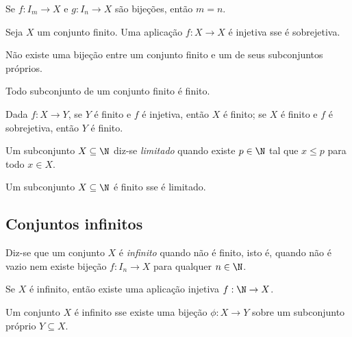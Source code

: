 \documentclass{article}
\begin{document}
\begin{cor}
    Se \(f: I_m \to X\) e \(g: I_n \to X\) são bijeções, então \(m = n\).
\end{cor}

\begin{cor}
    Seja \(X\) um conjunto finito. Uma aplicação \(f: X \to X\) é injetiva sse é sobrejetiva.
\end{cor}

\begin{cor}
    Não existe uma bijeção entre um conjunto finito e um de seus subconjuntos próprios.
\end{cor}

\begin{thm}
    Todo subconjunto de um conjunto finito é finito.
\end{thm}

\begin{cor}
    Dada \(f: X \to Y\), se \(Y\) é finito e \(f\) é injetiva, então \(X\) é finito; se \(X\) é finito e \(f\) é sobrejetiva, então \(Y\) é finito.
\end{cor}

\begin{defn}
    Um subconjunto \(X \subseteq \N\) diz-se \emph{limitado} quando existe \(p \in \N\) tal que \(x \leq p\) para todo \(x \in X\).
\end{defn}

\begin{cor}
    Um subconjunto \(X \subseteq \N\) é finito sse é limitado.
\end{cor}

\subsection{Conjuntos infinitos}

\begin{defn}
    Diz-se que um conjunto \(X\) é \emph{infinito} quando não é finito, isto é, quando não é vazio nem existe bijeção \(f: I_n \to X\) para qualquer \(n \in \N\).
\end{defn}

\begin{thm}
    Se \(X\) é infinito, então existe uma aplicação injetiva \(f: \N \to X\).
\end{thm}

\begin{cor}
    Um conjunto \(X\) é infinito sse existe uma bijeção \(\phi: X \to Y\) sobre um subconjunto próprio \(Y \subseteq X\).
\end{cor}
\end{document}

